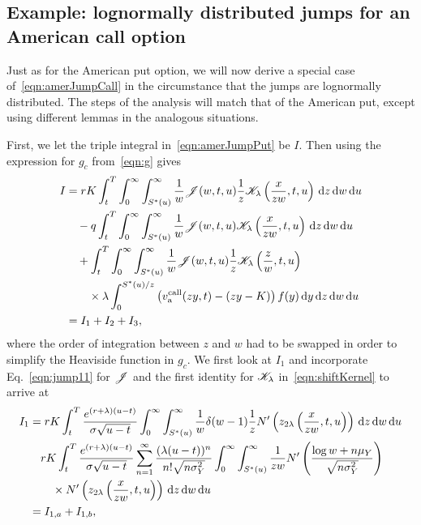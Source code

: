 		
		\subsection{Example: lognormally distributed jumps for an American call option}
		Just as for the American put option, we will now derive a special case of~\eqref{eqn:amerJumpCall} in the circumstance that the jumps are lognormally distributed. The steps of the analysis will match that of the American put, except using different lemmas in the analogous situations. 
		
        	First, we let the triple integral in~\eqref{eqn:amerJumpPut} be $I$. Then using the expression for $g_c$ from~\eqref{eqn:g} gives
        	\begin{align*}
        		I &= rK \int_t^T\int_0^\infty\int_{S^*(u)}^\infty\frac{1}{w}\mathscr J(w,t,u)\frac{1}{z}\mathscr K_\lambda\left( \frac{x}{zw},t,u \right) \, \mathrm d z \, \mathrm d w \, \mathrm d u \\
        		& {} \quad - q \int_t^T\int_0^\infty\int_{S^*(u)}^\infty\frac{1}{w}\mathscr J(w,t,u)\mathscr K_\lambda\left( \frac{x}{zw},t,u \right) \, \mathrm d z \, \mathrm d w \, \mathrm d u \\
        		& {} \quad + \int_t^T\int_0^\infty\int_{S^*(u)}^\infty \frac{1}{w}\mathscr J(w,t,u)\frac{1}{z}\mathscr K_\lambda\left( \frac{z}{w},t,u \right) \\
        		&{} \quad \quad \times  \lambda \int_{0}^{S^*(u)/z} \left( v_{\text{a}}^{\text{call}}(zy,t) - (zy-K) \right)f(y) \, \mathrm d y \, \mathrm d z \, \mathrm d w \, \mathrm d u \\
        		& = I_1 + I_2 + I_3,
        	\end{align*}
        	where the order of integration between $z$ and $w$ had to be swapped in order to simplify the Heaviside function in $g_c$. We first look at $I_1$ and incorporate Eq.~\eqref{eqn:jump11} for $\mathscr J$ and the first identity for $\mathscr K_\lambda$ in~\eqref{eqn:shiftKernel} to arrive at
        	        		\begin{align*}
        			I_1 &= rK\int_t^T \frac{e^{(r+\lambda)(u-t)}}{\sigma\sqrt{u-t}} \int_0^\infty\int_{S^*(u)}^\infty \frac{1}{w} \delta(w-1) \frac{1}{z} N'\left( z_{2\lambda}\left( \frac{x}{zw}, t, u \right) \right) \, \mathrm d z \, \mathrm d w \, \mathrm d u \\
        			& {}\quad rK\int_t^T \frac{e^{(r+\lambda)(u-t)}}{\sigma\sqrt{u-t}} \displaystyle\sum\limits_{n=1}^{\infty} \frac{(\lambda(u-t))^n}{n!\sqrt{n\sigma_Y^2}}\int_0^\infty \int_{S^*(u)}^\infty \frac{1}{zw}N'\left( \frac{\log w + n\mu_Y}{\sqrt{n\sigma_Y^2}} \right) \\
        			& {} \quad \quad \times N'\left( z_{2\lambda}\left( \frac{x}{zw}, t, u \right) \right) \, \mathrm d z \, \mathrm d w \, \mathrm d u \\
        			&= I_{1,a} + I_{1,b},
        		\end{align*}
